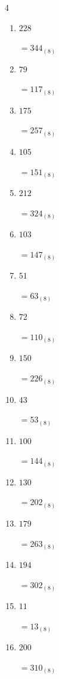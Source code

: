 \begin{multicols}{4}
\begin{enumerate}
  \item $228$

        $=344_{(8)}$

  \item $79$

        $=117_{(8)}$

  \item $175$

        $=257_{(8)}$

  \item $105$

        $=151_{(8)}$

  \item $212$

        $=324_{(8)}$

  \item $103$

        $=147_{(8)}$

  \item $51$

        $=63_{(8)}$

  \item $72$

        $=110_{(8)}$

  \item $150$

        $=226_{(8)}$

  \item $43$

        $=53_{(8)}$

  \item $100$

        $=144_{(8)}$

  \item $130$

        $=202_{(8)}$

  \item $179$

        $=263_{(8)}$

\columnbreak %

\resetques

  \item $194$

        $=302_{(8)}$

  \item $11$

        $=13_{(8)}$

  \item $200$

        $=310_{(8)}$


\end{enumerate}
\end{multicols}
